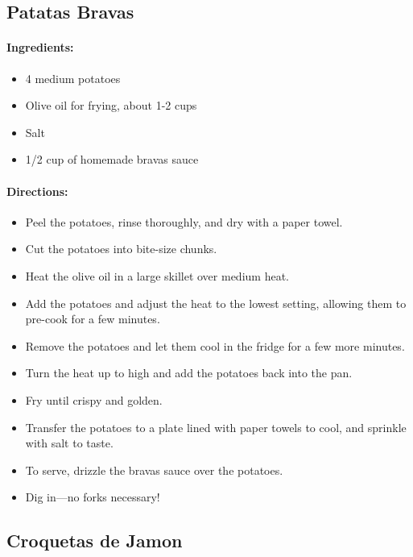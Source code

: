\documentclass{article}
\begin{document}
\subsection{Patatas Bravas}

\paragraph{Ingredients:}
\begin{itemize}
    \item 4 medium potatoes
    \item Olive oil for frying, about 1-2 cups
    \item Salt
    \item 1/2 cup of homemade bravas sauce
\end{itemize}

\paragraph{Directions:}
\begin{itemize}
    \item Peel the potatoes, rinse thoroughly, and dry with a paper towel.
    \item Cut the potatoes into bite-size chunks.
    \item Heat the olive oil in a large skillet over medium heat.
    \item Add the potatoes and adjust the heat to the lowest setting, allowing them to pre-cook for a few minutes.
    \item Remove the potatoes and let them cool in the fridge for a few more minutes.
    \item Turn the heat up to high and add the potatoes back into the pan.
    \item Fry until crispy and golden.
    \item Transfer the potatoes to a plate lined with paper towels to cool, and sprinkle with salt to taste.
    \item To serve, drizzle the bravas sauce over the potatoes.
    \item Dig in—no forks necessary!
\end{itemize}

\subsection{Croquetas de Jamon}
\end{document}
